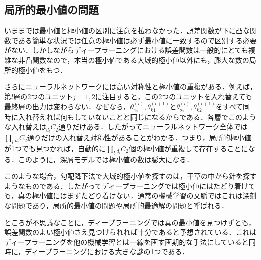 \documentclass[a4paper,11pt]{jsreport}
\begin{document}
\subsection{局所的最小値の問題}
いままでは最小値と極小値の区別に注意を払わなかった．誤差関数が下に凸な関数である簡単な状況では任意の極小値は必ず最小値に一致するので区別する必要がない．しかしながらディープラーニングにおける誤差関数は一般的にとても複雑な非凸関数なので，本当の極小値である大域的極小値以外にも，膨大な数の局所的極小値をもつ．\par
さらにニューラルネットワークには高い対称性と極小値の重複がある．例えば，第$l$層の2つのユニット$j=1,2$に注目すると，この2つのユニットを入れ替えても最終層の出力は変わらない．なぜなら，$\theta_{1i}^{(l)},\theta_{k1}^{(l+1)}$と$\theta_{2i}^{(l)},\theta_{k2}^{(l+1)}$をすべて同時に入れ替えれば何もしていないことと同じになるからである．各層でこのような入れ替えは${}_{d_l} C_2$通りだけある．したがってニューラルネットワーク全体では$\prod_l {}_{d_l} C_2$通りだけの入れ替え対称性があることがわかる．つまり，局所的極小値が1つでも見つかれば，自動的に$\prod_l {}_{d_l} C_2$個の極小値が重複して存在することになる．このように，深層モデルでは極小値の数は膨大になる．\par
このような場合，勾配降下法で大域的極小値を探すのは，干草の中から針を探すようなものである．したがってディープラーニングでは極小値にはたどり着けても，真の極小値にはまずたどり着けない．通常の機械学習の文脈ではこれは深刻な問題であり，局所的最小値の問題や局所的最適解の問題と呼ばれる．\par
ところが不思議なことに，ディープラーニングでは真の最小値を見つけずとも，誤差関数のよい極小値さえ見つけられれば十分であると予想されている．これはディープラーニングを他の機械学習とは一線を画す画期的な手法にしていると同時に，ディープラーニングにおける大きな謎の1つである．\par
\end{document}
